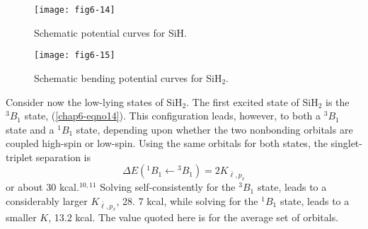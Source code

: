 \begin{figure}
\texttt{[image: fig6-14]}
\caption{Schematic potential curves for SiH.}
\label{chap6-fig15}
\end{figure}

\begin{figure}
\texttt{[image: fig6-15]}
\caption{Schematic bending potential curves for SiH$_2$.}
\label{chap6-fig16}
\end{figure}

Consider now the low-lying states of SiH$_2$. The first excited state
of SiH$_2$ is the ${^3B}_1$ state, (\ref{chap6-eqno14}).  This
configuration leads, however, to both a ${^3B}_1$ state and a
${^1B}_1$ state, depending upon whether the two nonbonding orbitals
are coupled high-spin or low-spin.  Using the same orbitals for both
states, the singlet-triplet separation is
\begin{equation}
\Delta E \left( {^1B}_1 \leftarrow {^3B}_1 \right) = 2 
K_{{\bar{\ell},p_x}}
\end{equation}
or about 30 kcal.$^{10,11}$  Solving self-consistently for the ${^3B}_1$ 
state, leads to a considerably larger
$K_{{\bar{\ell}},p_x}$, 28. 7 kcal, while solving for the ${^1B}_1$ 
state, leads to a smaller 
$K$, 13.2 kcal.  The value quoted here is for the average set of orbitals.

